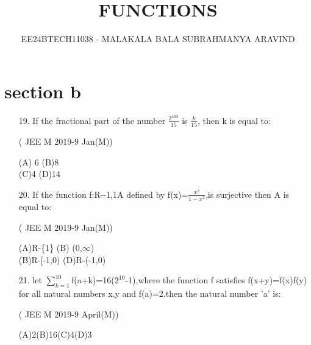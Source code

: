 \documentclass[journal,12pt,twocolumn]{IEEEtran}
\theoremstyle{remark}
\begin{document}

\vspace{3cm}

\title{FUNCTIONS}
\author{EE24BTECH11038 - MALAKALA BALA SUBRAHMANYA ARAVIND}
\maketitle
\newpage
\bigskip

\renewcommand{\thefigure}{\theenumi}
\renewcommand{\thetable}{\theenumi}
\section{section b}
\begin{enumerate}
\item[19.]If the fractional part of the number $\frac{2^{403}}{15}$ is $\frac{k}{15}$, then k is equal to:

  \hfill {( JEE M 2019-9 Jan(M))}

   (A) 6   \hspace{2cm} (B)8\\

   (C)4  \hspace{2cm}  (D)14\\

\item[20.] If the function f:R-{-1,1}A defined by f(x)=$\frac{x^2}{1-x^2}$,is surjective then A is equal to:

   \hfill {( JEE M 2019-9 Jan(M))}

 (A)R-\{1\}  \hspace{2cm}  (B) (0,$\infty$)\\

 (B)R-[-1,0) \hspace{2cm}  (D)R-(-1,0)\\

    \item[21.] let $\sum\limits_{k=1}^{10}$f(a+k)=16($2^{10}$-1),where the function f satisfies f(x+y)=f(x)f(y) for all natural numbers x,y and f(a)=2.then the natural number 'a' is:

    \hfill {( JEE M 2019-9 April(M))}

    (A)2\hspace{1cm}(B)16\hspace{1cm}(C)4\hspace{1cm}(D)3
    
     
     
  \end{enumerate}
\end{document}
